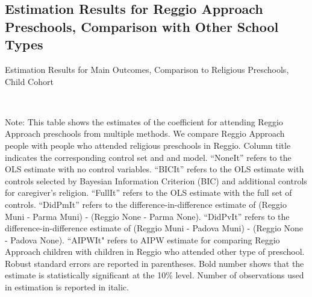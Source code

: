\subsection{Estimation Results for Reggio Approach Preschools, Comparison with Other School Types}

\begin{table}[H] \caption{Estimation Results for Main Outcomes, Comparison to Religious Preschools, Child Cohort} \label{ols-M-child-reg-reli}
\scalebox{0.8}{}
\vspace{1ex} \\
\footnotesize\raggedright{Note: This table shows the estimates of the coefficient for attending Reggio Approach preschools from multiple methods. We compare Reggio Approach people with people who attended religious preschools in Reggio. Column title indicates the corresponding control set and and model. ``NoneIt'' refers to the OLS estimate with no control variables. ``BICIt'' refers to the OLS estimate with controls selected by Bayesian Information Criterion (BIC) and additional controls for caregiver's religion. ``FullIt'' refers to the OLS estimate with the full set of controls. ``DidPmIt'' refers to the difference-in-difference estimate of (Reggio Muni - Parma Muni) - (Reggio None - Parma None). ``DidPvIt'' refers to the difference-in-difference estimate of (Reggio Muni - Padova Muni) - (Reggio None - Padova None). ``AIPWIt" refers to AIPW estimate for comparing Reggio Approach children with children in Reggio who attended other type of preschool. Robust standard errors are reported in parentheses. Bold number shows that the estimate is statistically significant at the 10\% level. Number of observations used in estimation is reported in italic.}

\end{table}


